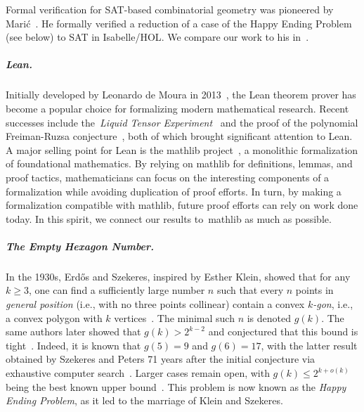 Formal verification for SAT-based combinatorial geometry
was pioneered by Marić~\cite{19maric_fast_formal_proof_erdos_szekeres_conjecture_convex_polygons_most_six_points}.
He formally verified a reduction of a case of the Happy Ending Problem (see below) to SAT in \textsf{Isabelle/HOL}.
We compare our work to his in~.

\subparagraph*{Lean.}
Initially developed by Leonardo de Moura in 2013~\cite{demouraLeanTheoremProver2015},
the Lean theorem prover has become a popular choice for formalizing modern mathematical research.
Recent successes include the~\emph{Liquid Tensor Experiment}~\cite{Castelvecchi2021}
and the proof of the polynomial Freiman-Ruzsa conjecture~\cite{gowers2023conjecture, slomanATeamMathProves2023},
both of which brought significant attention to Lean.
A major selling point for Lean is the \textsf{mathlib} project~\cite{The_mathlib_Community_2020},
a monolithic formalization of foundational mathematics.
By relying on \textsf{mathlib} for definitions, lemmas, and proof tactics,
mathematicians can focus on the interesting components of a formalization
while avoiding duplication of proof efforts.
In turn, by making a formalization compatible with \textsf{mathlib},
future proof efforts can rely on work done today.
In this spirit, we connect our results to~\textsf{mathlib} as much as possible.

\subparagraph*{The Empty Hexagon Number.}
In the 1930s,
Erd\H{o}s and Szekeres, inspired by Esther Klein, showed that for any $k \geq 3$,
one can find a sufficiently large number $n$
such that every $n$ points in \emph{general position}
(i.e., with no three points collinear)
contain a convex \emph{$k$-gon}, i.e., a convex polygon with $k$ vertices~\cite{35erdos_combinatorial_problem_geometry}.
The minimal such $n$ is denoted $g(k)$.
The same authors later showed that $g(k) > 2^{k-2}$
and conjectured that this bound is tight~\cite{60erdos_some_extremum_problems_elementary_geometry}.
Indeed, it is known that $g(5) = 9$ and $g(6) = 17$,
with the latter result obtained by Szekeres and Peters 71 years after the initial conjecture
via exhaustive computer search~\cite{06szekeres_computer_solution_17_point_erdos_szekeres_problem}.
Larger cases remain open,
with $g(k) \leq 2^{k+o(k)}$ being the best known upper bound~\cite{suk2017erdos,holmsen2017two}.
This problem is now known as the \emph{Happy Ending Problem},
as it led to the marriage of Klein and Szekeres.


